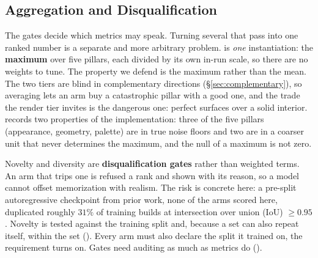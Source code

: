 \subsection{Aggregation and Disqualification}
\label{sec:blockscore}

The gates decide which metrics may speak. Turning several that pass into one ranked
number is a separate and more arbitrary problem. \blockscore{} is \emph{one} instantiation: the \textbf{maximum} over five pillars, each
divided by its own in-run scale, so there are no weights to tune. The property we defend is the maximum rather than the mean. The two tiers are
blind in complementary directions (\S\ref{sec:complementary}), so averaging lets an arm
buy a catastrophic pillar with a good one, and the trade the render tier invites is the
dangerous one: perfect surfaces over a solid interior.   records two properties of
the implementation: three of the five pillars (appearance, geometry, palette) are in true noise floors and two are in a
coarser unit that never determines the maximum, and the null of a maximum is not zero.

Novelty and diversity are \textbf{disqualification gates} rather than weighted terms.
An arm that trips one is refused a rank and shown with its reason, so a model cannot
offset memorization with realism. The risk is concrete here: a pre-split autoregressive
checkpoint from prior work, none of the arms scored here, duplicated roughly $31\%$ of training builds at intersection
over union (IoU) $\geq 0.95$. Novelty is tested against the training split and, because a
set can also repeat itself, within the set (). Every arm must also declare the split it trained on, the
requirement  turns on. Gates need auditing as much as metrics do
().
